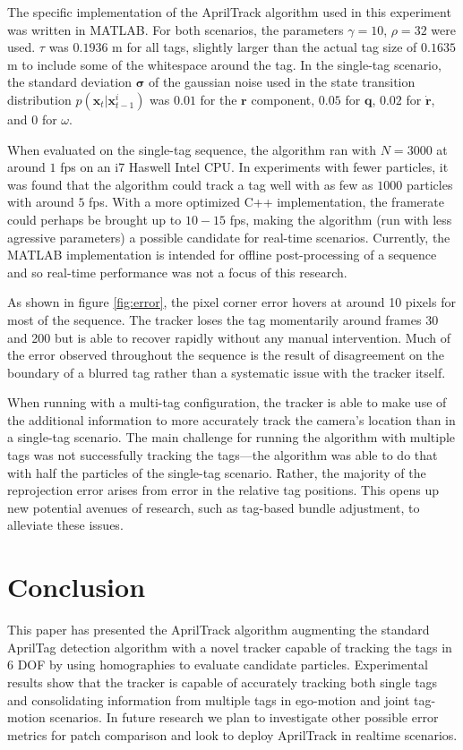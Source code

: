 \documentclass[letterpaper, 10 pt, conference]{ieeeconf}
\renewcommand{\vec}[1]{\boldsymbol{#1}}
\begin{document}
The specific implementation of the AprilTrack algorithm used in this experiment was written in MATLAB. For both scenarios, the parameters $\gamma = 10$, $\rho=32$ were used. $\tau$ was $0.1936$ m for all tags, slightly larger than the actual tag size of $0.1635$ m to include some of the whitespace around the tag. In the single-tag scenario, the standard deviation $\vec{\sigma}$  of the gaussian noise used in the state transition distribution $p(\vec{x}_t|\vec{x}^i_{t-1})$ was $0.01$ for the $\vec{r}$ component, $0.05$ for $\vec{q}$, $0.02$ for $\dot{\vec{r}}$, and $0$ for $\omega$.


When evaluated on the single-tag sequence, the algorithm ran with $N=3000$ at around $1$ fps on an i7 Haswell Intel CPU. In experiments with fewer particles, it was found that the algorithm could track a tag well with as few as $1000$ particles with around $5$ fps. With a more optimized C++ implementation, the framerate could perhaps be brought up to $10-15$ fps, making the algorithm (run with less agressive parameters) a possible candidate for real-time scenarios. Currently, the MATLAB implementation is intended for offline post-processing of a sequence and so real-time performance was not a focus of this research.


As shown in figure \ref{fig:error}, the pixel corner error hovers at around 10 pixels for most of the sequence. The tracker loses the tag momentarily around frames 30 and 200 but is able to recover rapidly without any manual intervention. Much of the error observed throughout the sequence is the result of disagreement on the boundary of a blurred tag rather than a systematic issue with the tracker itself.

When running with a multi-tag configuration, the tracker is able to make use of the additional information to more accurately track the camera's location than in a single-tag scenario. The main challenge for running the algorithm with multiple tags was not successfully tracking the tags---the algorithm was able to do that with half the particles of the single-tag scenario. Rather, the majority of the reprojection error arises from error in the relative tag positions. This opens up new potential avenues of research, such as tag-based bundle adjustment, to alleviate these issues.

\section{Conclusion}

This paper has presented the AprilTrack algorithm augmenting the standard AprilTag detection algorithm with a novel tracker capable of tracking the tags in 6 DOF by using homographies to evaluate candidate particles. Experimental results show that the tracker is capable of accurately tracking both single tags and consolidating information from multiple tags in ego-motion and joint tag-motion scenarios. In future research we plan to investigate other possible error metrics for patch comparison and look to deploy AprilTrack in realtime scenarios.


{}
\end{document}
